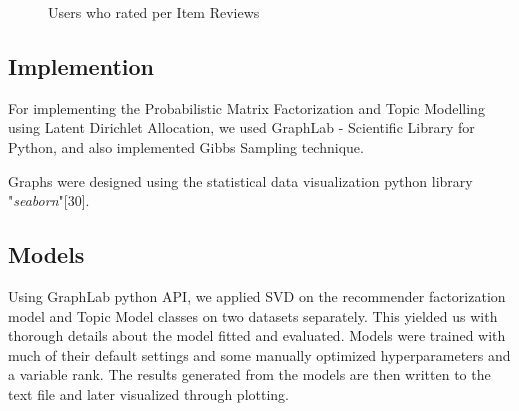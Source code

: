 \begin{figure}[H]
  {\par}
  \caption{Users who rated per Item Reviews}\label{Users who rated per Item Reviews}
\end{figure}

\subsection{Implemention}
For implementing the Probabilistic Matrix Factorization and Topic Modelling using Latent Dirichlet Allocation, we used GraphLab - Scientific Library for Python, and also implemented Gibbs Sampling technique.

Graphs were designed using the statistical data visualization python library "\textit{seaborn}"[30].

\subsection{Models}
Using GraphLab python API, we applied SVD on the recommender factorization model and Topic Model classes on two datasets separately. This yielded us with thorough details about the model fitted and evaluated. Models were trained with much of their default settings and some manually optimized hyperparameters and a variable rank. The results generated from the models are then written to the text file and later visualized through plotting.

